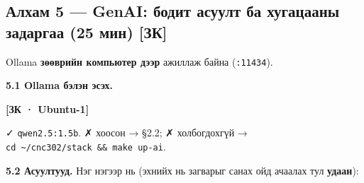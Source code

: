 \hypertarget{ux430ux43bux445ux430ux43c-5-genai-ux431ux43eux434ux438ux442-ux430ux441ux443ux443ux43bux442-ux431ux430-ux445ux443ux433ux430ux446ux430ux430ux43dux44b-ux437ux430ux434ux430ux440ux433ux430ux430-25-ux43cux438ux43d-ux437ux43a}{%
\subsection{Алхам 5 --- GenAI: бодит асуулт ба хугацааны задаргаа (25 мин) {[}ЗК{]}}\label{ux430ux43bux445ux430ux43c-5-genai-ux431ux43eux434ux438ux442-ux430ux441ux443ux443ux43bux442-ux431ux430-ux445ux443ux433ux430ux446ux430ux430ux43dux44b-ux437ux430ux434ux430ux440ux433ux430ux430-25-ux43cux438ux43d-ux437ux43a}}

Ollama \textbf{зөөврийн компьютер дээр} ажиллаж байна (\texttt{:11434}).

\textbf{5.1 Ollama бэлэн эсэх.}

\textbf{{[}ЗК · Ubuntu-1{]}}

\begin{Shaded}
\begin{Highlighting}[]
\KeywordTok{|} 
\end{Highlighting}
\end{Shaded}

✓ \texttt{qwen2.5:1.5b}. ✗ хоосон → §2.2; ✗ холбогдохгүй → \texttt{cd\ \textasciitilde{}/cnc302/stack\ \&\&\ make\ up-ai}.

\textbf{5.2 Асуултууд.} Нэг нэгээр нь (эхнийх нь загварыг санах ойд ачаалах тул \textbf{удаан}):

\begin{Shaded}
\begin{Highlighting}[]
 
 
 
 
\end{Highlighting}
\end{Shaded}

